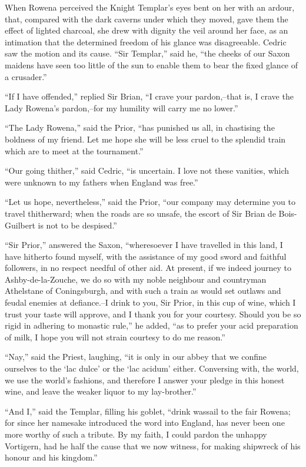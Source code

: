When Rowena perceived the Knight Templar's eyes bent on her with an
ardour, that, compared with the dark caverns under which they moved,
gave them the effect of lighted charcoal, she drew with dignity the veil
around her face, as an intimation that the determined freedom of his
glance was disagreeable. Cedric saw the motion and its cause. ``Sir
Templar,'' said he, ``the cheeks of our Saxon maidens have seen too
little of the sun to enable them to bear the fixed glance of a
crusader.''

``If I have offended,'' replied Sir Brian, ``I crave your pardon,--that
is, I crave the Lady Rowena's pardon,--for my humility will carry me no
lower.''

``The Lady Rowena,'' said the Prior, ``has punished us all, in
chastising the boldness of my friend. Let me hope she will be less cruel
to the splendid train which are to meet at the tournament.''

``Our going thither,'' said Cedric, ``is uncertain. I love not these
vanities, which were unknown to my fathers when England was free.''

``Let us hope, nevertheless,'' said the Prior, ``our company may
determine you to travel thitherward; when the roads are so unsafe, the
escort of Sir Brian de Bois-Guilbert is not to be despised.''

``Sir Prior,'' answered the Saxon, ``wheresoever I have travelled in
this land, I have hitherto found myself, with the assistance of my good
sword and faithful followers, in no respect needful of other aid. At
present, if we indeed journey to Ashby-de-la-Zouche, we do so with my
noble neighbour and countryman Athelstane of Coningsburgh, and with such
a train as would set outlaws and feudal enemies at defiance.--I drink to
you, Sir Prior, in this cup of wine, which I trust your taste will
approve, and I thank you for your courtesy. Should you be so rigid in
adhering to monastic rule,'' he added, ``as to prefer your acid
preparation of milk, I hope you will not strain courtesy to do me
reason.''

``Nay,'' said the Priest, laughing, ``it is only in our abbey that we
confine ourselves to the `lac dulce' or the `lac acidum' either.
Conversing with, the world, we use the world's fashions, and therefore I
answer your pledge in this honest wine, and leave the weaker liquor to
my lay-brother.''

``And I,'' said the Templar, filling his goblet, ``drink wassail to the
fair Rowena; for since her namesake introduced the word into England,
has never been one more worthy of such a tribute. By my faith, I could
pardon the unhappy Vortigern, had he half the cause that we now witness,
for making shipwreck of his honour and his kingdom.''

